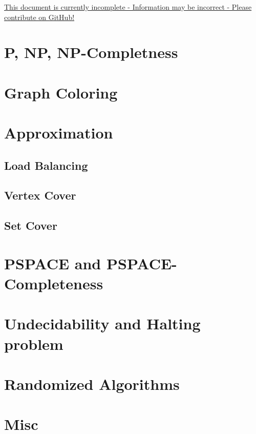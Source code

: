 \documentclass{article}
\begin{document}
\underline{This document is currently incomplete - Information may be incorrect - Please contribute on GitHub!}
\section{P, NP, NP-Completness}
\section{Graph Coloring}
\section{Approximation}
\subsection{Load Balancing}
\subsection{Vertex Cover}
\subsection{Set Cover}
\section{PSPACE and PSPACE-Completeness}
\section{Undecidability and Halting problem}
\section{Randomized Algorithms}
\section{Misc}
\end{document}
